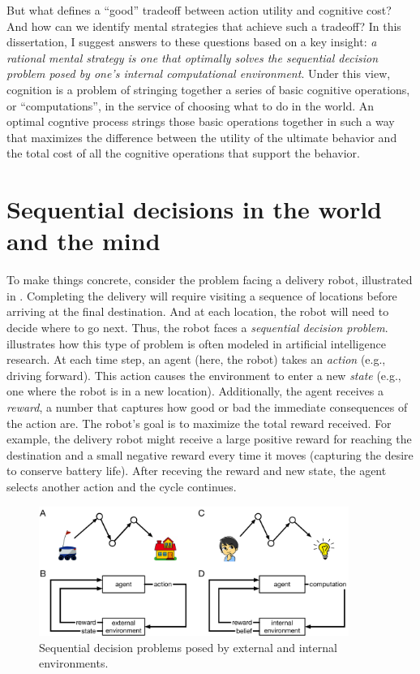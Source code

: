 But what defines a ``good'' tradeoff between action utility and cognitive cost? And how can we identify mental strategies that achieve such a tradeoff? In this dissertation, I suggest answers to these questions based on a key insight: \emph{a rational mental strategy is one that optimally solves the sequential decision problem posed by one's internal computational environment}. Under this view, cognition is a problem of stringing together a series of basic cognitive operations, or ``computations'', in the service of choosing what to do in the world. An optimal cogntive process strings those basic operations together in such a way that maximizes the difference between the utility of the ultimate behavior and the total cost of all the cognitive operations that support the behavior.


\section{Sequential decisions in the world and the mind}\label{sec:intro-intuition}

To make things concrete, consider the problem facing a delivery robot, illustrated in . Completing the delivery will require visiting a sequence of locations before arriving at the final destination. And at each location, the robot will need to decide where to go next. Thus, the robot faces a \emph{sequential decision problem}.  illustrates how this type of problem is often modeled in artificial intelligence research. At each time step, an agent (here, the robot) takes an \emph{action} (e.g., driving forward). This action causes the environment to enter a new \emph{state} (e.g., one where the robot is in a new location). Additionally, the agent receives a \emph{reward}, a number that captures how good or bad the immediate consequences of the action are. The robot's goal is to maximize the total reward received. For example, the delivery robot might receive a large positive reward for reaching the destination and a small negative reward every time it moves (capturing the desire to conserve battery life). After receving the reward and new state, the agent selects another action and the cycle continues.

\begin{figure}[tb]
  \centering
  \includegraphics[width=0.9\textwidth]{diagrams/sequential-intuition.pdf}
  \caption{Sequential decision problems posed by external and internal environments.}
  \label{fig:sequential-intuition}
\end{figure}

